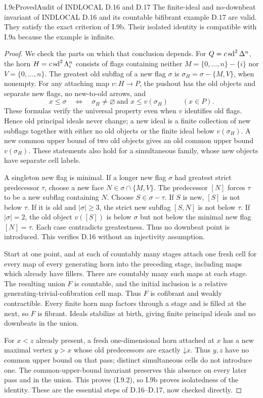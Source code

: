 \begin{claim}{I.9c}{Proved}{Audit of INDLOCAL D.16 and D.17}
The finite-ideal and no-downbeat invariant of INDLOCAL D.16 and its
countable bifibrant example D.17 are valid. They satisfy the exact
criterion of I.9b. Their isolated identity is compatible with I.9a
because the example is infinite.
\end{claim}
\begin{proof}
We check the parts on which that conclusion depends. For
$Q=c\operatorname{sd}^2\Delta^n$, the horn $H=c\operatorname{sd}^2\Lambda_i^n$ consists
of flags containing neither $M=\{0,\ldots,n\}-\{i\}$ nor
$V=\{0,\ldots,n\}$. The greatest old subflag of a new flag
$\sigma$ is $\sigma_H=\sigma-\{M,V\}$, when nonempty.
For any attaching map $v:H\to P$, the pushout has the old objects
and separate new flags, no new-to-old arrows, and
\[
 x\leq\sigma\quad\Longleftrightarrow\quad
 \sigma_H\ne\varnothing\ \text{and }x\leq v(\sigma_H)
 \qquad(x\in P).
\]
These formulas verify the universal property even when $v$ identifies
old flags. Hence old principal ideals never change; a new ideal
is a finite collection of new subflags together with either no old
objects or the finite ideal below $v(\sigma_H)$. A new common upper
bound of two old objects gives an old common upper bound
$v(\sigma_H)$. These statements also hold for a simultaneous family,
whose new objects have separate cell labels.

A singleton new flag is minimal. If a longer new flag $\sigma$
had greatest strict predecessor $\tau$, choose a new face
$N\in\sigma\cap\{M,V\}$. The predecessor $[N]$ forces $\tau$
to be a new subflag containing $N$. Choose $S\in\sigma-\tau$.
If $S$ is new, $[S]$ is not below $\tau$. If it is old and
$|\sigma|\geq3$, the strict new subflag $[S,N]$ is not below
$\tau$. If $|\sigma|=2$, the old object $v([S])$ is below
$\sigma$ but not below the minimal new flag $[N]=\tau$.
Each case contradicts greatestness. Thus no downbeat point is
introduced. This verifies D.16 without an injectivity assumption.

Start at one point, and at each of countably many stages attach one
fresh cell for every map of every generating horn into the preceding
stage, including maps which already have fillers. There are countably
many such maps at each stage. The resulting union $F$ is countable,
and the initial inclusion is a relative generating-trivial-cofibration
cell map. Thus $F$ is cofibrant and weakly contractible. Every finite
horn map factors through a stage and is filled at the next, so $F$
is fibrant. Ideals stabilize at birth, giving finite principal ideals
and no downbeats in the union.

For $x<z$ already present, a fresh one-dimensional horn attached at
$x$ has a new maximal vertex $y>x$ whose old predecessors are
exactly $\mathord\downarrow x$. Thus $y,z$ have no common upper
bound on that pass; distinct simultaneous cells do not introduce
one. The common-upper-bound invariant preserves this absence on
every later pass and in the union. This proves (I.9.2), so I.9b
proves isolatedness of the identity. These are the essential steps
of D.16--D.17, now checked directly.
\end{proof}

